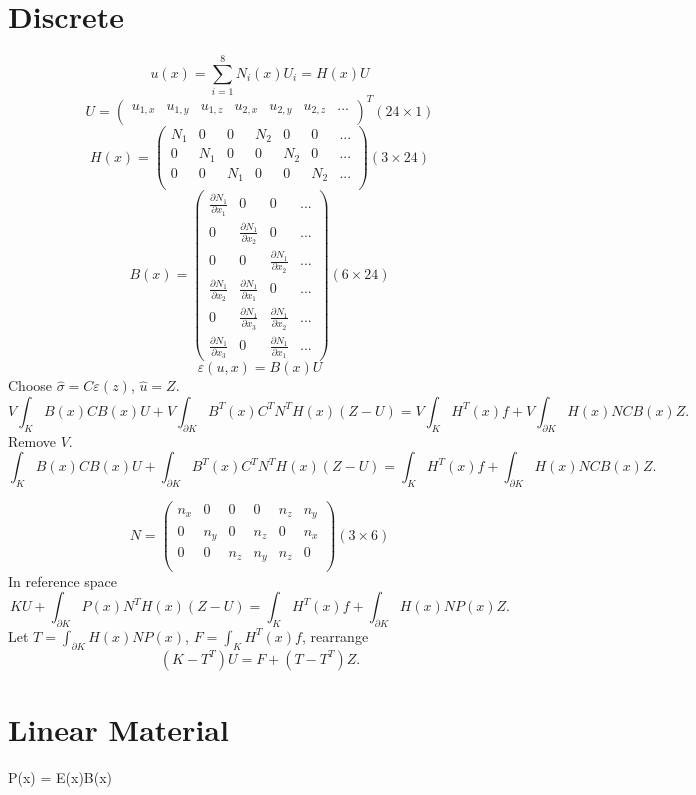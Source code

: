 \documentclass{article}
\begin{document}
\section{Discrete}
	\[u(x)=\sum_{i=1}^{8}N_i(x)U_i = H(x)U\]
	\[U = \begin{pmatrix}
	u_{1,x} & u_{1,y} & u_{1,z} & u_{2,x} & u_{2,y} & u_{2,z} & ...\\
	\end{pmatrix}^T(24\times 1)\]
	\[H(x) = \begin{pmatrix}
	  N_1 & 0   & 0   & N_2 & 0   & 0   & ...\\
	  0   & N_1 & 0   & 0   & N_2 & 0   & ...\\
	  0   & 0   & N_1 & 0   & 0   & N_2 & ...\\	  	  
	\end{pmatrix}(3\times 24)\]
	\[B(x) = \begin{pmatrix}
	  \frac{\partial N_1}{\partial x_1} & 0 & 0& ...\\
	  0 & \frac{\partial N_1}{\partial x_2} & 0& ...\\
	  0 & 0 & \frac{\partial N_1}{\partial x_2}& ...\\
 	  \frac{\partial N_1}{\partial x_2} & \frac{\partial N_1}{\partial x_1} & 0& ...\\
  	  0 & \frac{\partial N_1}{\partial x_3} & \frac{\partial N_1}{\partial x_2}& ...\\
  	  \frac{\partial N_1}{\partial x_3} & 0 & \frac{\partial N_1}{\partial x_1}& ...
	\end{pmatrix}(6\times 24)\]
	\[\varepsilon(u,x) = B(x)U\]
	Choose $\hat{\sigma}=C\varepsilon(z)$, $\hat{u}=Z$.
	\[V\int_K B(x)CB(x)U + V\int_{\partial K}B^T(x)C^TN^TH(x)(Z-U)
	=V\int_K H^T(x)f+V\int_{\partial K}H(x)NCB(x)Z.\]
	Remove $V$.
	\[\int_K B(x)CB(x)U + \int_{\partial K}B^T(x)C^TN^TH(x)(Z-U)
	=\int_K H^T(x)f + \int_{\partial K}H(x)NCB(x)Z.\]
	
	\[
	N = \begin{pmatrix}
	n_x & 0   & 0   & 0   & n_z & n_y\\
	0   & n_y & 0   & n_z & 0   & n_x\\
	0   & 0   & n_z & n_y & n_z & 0  \\		
	\end{pmatrix}(3\times 6)
	\]
	In reference space
	\[KU + \int_{\partial K}P(x)N^TH(x)(Z-U)
	=\int_K H^T(x)f + \int_{\partial K}H(x)NP(x)Z.\]
	Let $T=\int_{\partial K}H(x)NP(x)$, $F = \int_K H^T(x)f$, rearrange
	\[(K-T^T)U=F + (T-T^T)Z.\]
	
\section{Linear Material}
	P(x) = E(x)B(x)
\end{document}
